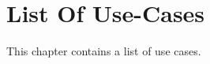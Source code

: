 
\newpage
\chapter{List Of Use-Cases}
\label{chap:UseCaseList}

This chapter contains a list of use cases. 

